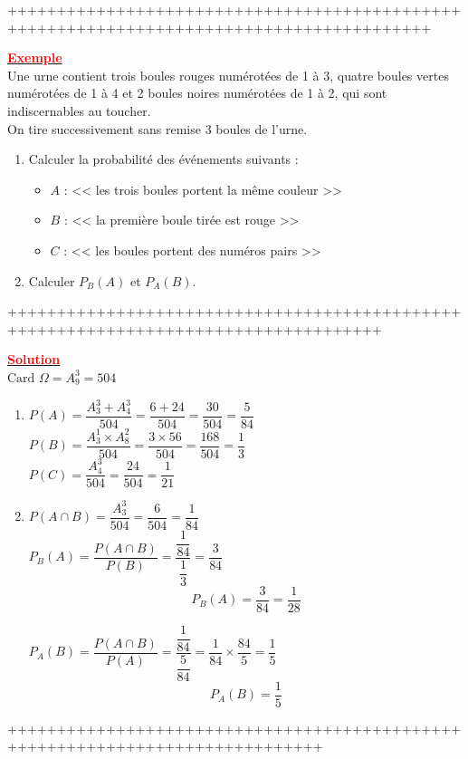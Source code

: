 \documentclass[12pt,a4paper]{article}
\begin{document}
+++++++++++++++++++++++++++++++++++++++++++++++++++++++++++++++++++++++++++++++++++++++++

\underline{\textbf{\textcolor{red}{Exemple}}}\\

Une urne contient trois boules rouges numérotées de 1 à 3, quatre boules vertes numérotées de 1 à 4 et 2 boules noires numérotées de 1 à 2, qui sont indiscernables au toucher. \\
On tire successivement sans remise 3 boules de l'urne.

\begin{enumerate}
    \item Calculer la probabilité des événements suivants :
    \begin{itemize}
        \item $A$ : << les trois boules portent la même couleur >>
        \item $B$ : << la première boule tirée est rouge >>
        \item $C$ : << les boules portent des numéros pairs >>
    \end{itemize}
    \item Calculer $P_B(A)$ et $P_A(B)$.
\end{enumerate}

++++++++++++++++++++++++++++++++++++++++++++++++++++++++++++++++++++++++++++++++++++

\underline{\textbf{\textcolor{red}{Solution}}}\\

$\text{Card } \Omega = A_9^3 = 504$
\begin{enumerate}
\item $P(A) = \dfrac{A_3^3 + A_4^3}{504} = \dfrac{6 + 24}{504} = \dfrac{30}{504} = \dfrac{5}{84}$ \\

$P(B) = \dfrac{A_3^1 \times A_8^2}{504} = \dfrac{3 \times 56}{504} = \dfrac{168}{504} = \dfrac{1}{3}$ \\

$P(C) = \dfrac{A_4^3}{504} = \dfrac{24}{504} = \dfrac{1}{21}$

\item $P(A \cap B) = \dfrac{A_3^3}{504} = \dfrac{6}{504} = \dfrac{1}{84}$ \\

$P_B(A) = \dfrac{P(A \cap B)}{P(B)} = \dfrac{\dfrac{1}{84}}{\dfrac{1}{3}} = \dfrac{3}{84}$ \\
\begin{equation*}
    \boxed{P_B(A) = \dfrac{3}{84} = \dfrac{1}{28}}
\end{equation*}

$P_A(B) = \dfrac{P(A \cap B)}{P(A)} = \dfrac{\dfrac{1}{84}}{\dfrac{5}{84}} = \dfrac{1}{84} \times \dfrac{84}{5} = \dfrac{1}{5}$ \\
\begin{equation*}
    \boxed{P_A(B) = \dfrac{1}{5}}
\end{equation*}

\end{enumerate}
\newpage
++++++++++++++++++++++++++++++++++++++++++++++++++++++++++++++++++++++++++++++
\end{document}
